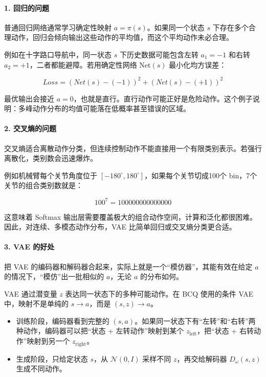 \hypertarget{ux56deux5f52ux7684ux95eeux9898}{%
\paragraph{1. 回归的问题}\label{ux56deux5f52ux7684ux95eeux9898}}

普通回归网络通常学习确定性映射 \(a=\pi(s)\)。如果同一个状态 \(s\) 下存在多个合理动作，回归会倾向输出这些动作的平均值，而这个平均动作未必合理。

例如在十字路口导航中，同一状态 \(s\) 下历史数据可能包含左转 \(a_1=-1\) 和右转 \(a_2=+1\)，二者都能避障。若用确定性网络 \(\mathrm{Net}(s)\) 最小化均方误差：

\[
Loss=(Net(s)-(-1))^{2}+(Net(s)-(+1))^{2}
\]

最优输出会接近 \(a=0\)，也就是直行。直行动作可能正好是危险动作。这个例子说明：多峰动作分布的均值可能落在低概率甚至错误的区域。

\hypertarget{ux4ea4ux53c9ux71b5ux7684ux95eeux9898}{%
\paragraph{2. 交叉熵的问题}\label{ux4ea4ux53c9ux71b5ux7684ux95eeux9898}}

交叉熵适合离散动作分类，但连续控制动作不能直接用一个有限类别表示。若强行离散化，类别数会迅速爆炸。

例如机械臂每个关节角度位于 \([-180^{\circ},180^{\circ}]\)，如果每个关节切成100个 bin，7个关节的组合类别数就是：

\[
100^{7} = 100000000000000
\]

这意味着 Softmax 输出层需要覆盖极大的组合动作空间，计算和泛化都很困难。因此，对连续、多模态动作分布，VAE 比简单回归或交叉熵分类更合适。

\hypertarget{vae-ux7684ux597dux5904}{%
\paragraph{3. VAE 的好处}\label{vae-ux7684ux597dux5904}}

把 VAE 的编码器和解码器合起来，实际上就是一个``模仿器''，其能有效在给定 \(a\) 的情况下，``模仿''出一批相似的 \(a\)，无论 \(a\) 的分布如何。

VAE 通过潜变量 \(z\) 表达同一状态下的多种可能动作。在 BCQ 使用的条件 VAE 中，映射不是单纯的 \(s\to a\)，而是 \((s,z)\to a\)。

\begin{itemize}
\tightlist
\item
  训练阶段，编码器看到完整的 \((s,a)\)。如果同一状态下有``左转''和``右转''两种动作，编码器可以把``状态 + 左转动作''映射到某个 \(z_{\mathrm{left}}\)，把``状态 + 右转动作''映射到另一个 \(z_{\mathrm{right}}\)。
\item
  生成阶段，只给定状态 \(s\)，从 \(\mathcal{N}(0,I)\) 采样不同 \(z\)，再交给解码器 \(D_\omega(s,z)\) 生成不同动作。
\end{itemize}

